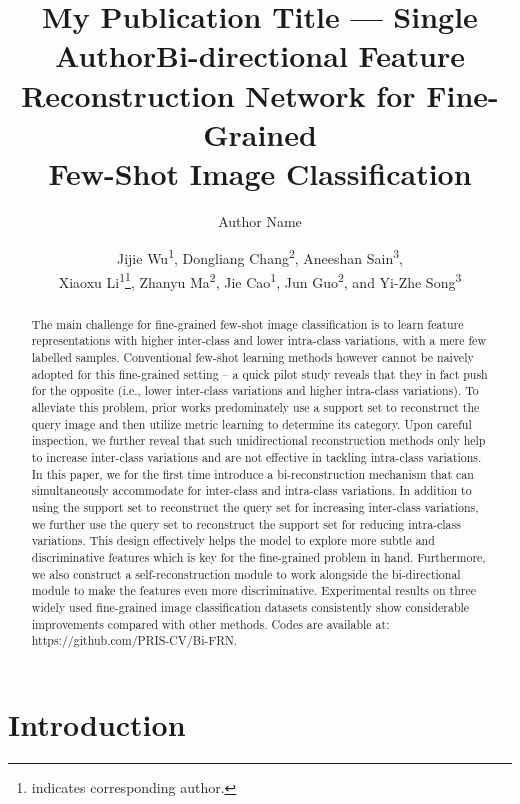 \documentclass[letterpaper]{article} %
\title{My Publication Title --- Single Author}
\author {
    Author Name
}
\title{Bi-directional Feature Reconstruction Network for Fine-Grained \\ Few-Shot Image Classification}
\author {
    Jijie Wu\textsuperscript{\rm 1}, 
    Dongliang Chang\textsuperscript{\rm 2},
    Aneeshan Sain\textsuperscript{\rm 3},\\
    Xiaoxu Li\textsuperscript{\rm 1}\thanks{indicates corresponding author.},
    Zhanyu Ma\textsuperscript{\rm 2},
    Jie Cao\textsuperscript{\rm 1},
    Jun Guo\textsuperscript{\rm 2}, 
    and Yi-Zhe Song\textsuperscript{\rm 3}
}
\begin{document}
\maketitle

\begin{abstract}
The main challenge for fine-grained few-shot image classification is to learn feature representations with higher inter-class and lower intra-class variations, with a mere few labelled samples. Conventional few-shot learning methods however cannot be naively adopted for this fine-grained setting -- a quick pilot study reveals that they in fact push for the opposite (i.e., lower inter-class variations and higher intra-class variations). To alleviate this problem, prior works predominately use a support set to reconstruct the query image and then utilize metric learning to determine its category. Upon careful inspection, we further reveal that such unidirectional reconstruction methods only help to increase inter-class variations and are not effective in tackling intra-class variations. In this paper, we for the first time introduce a bi-reconstruction mechanism that can simultaneously accommodate for inter-class and intra-class variations. In addition to using the support set to reconstruct the query set for increasing inter-class variations, we further use the query set to reconstruct the support set for reducing intra-class variations. This design effectively helps the model to explore more subtle and discriminative features which is key for the fine-grained problem in hand. Furthermore, we also construct a self-reconstruction module to work alongside the bi-directional module to make the features even more discriminative. Experimental results on three widely used fine-grained image classification datasets consistently show considerable improvements compared with other methods. 
Codes are available at: https://github.com/PRIS-CV/Bi-FRN.
\end{abstract}

\section{Introduction}
\end{document}
